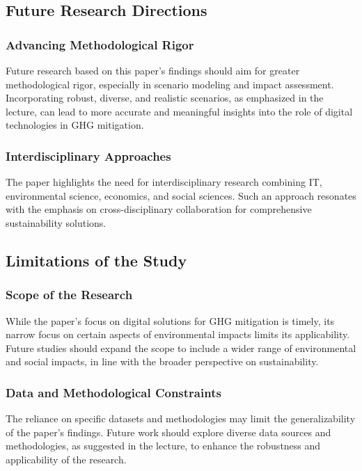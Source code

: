 \documentclass[conference,compsoc]{IEEEtran}
\begin{document}
\subsection{Future Research Directions}

\subsubsection{Advancing Methodological Rigor}

Future research based on this paper's findings should aim for greater methodological rigor, especially in scenario modeling and impact assessment. Incorporating robust, diverse, and realistic scenarios, as emphasized in the lecture, can lead to more accurate and meaningful insights into the role of digital technologies in GHG mitigation.

\subsubsection{Interdisciplinary Approaches}

The paper highlights the need for interdisciplinary research combining IT, environmental science, economics, and social sciences. Such an approach resonates with the  emphasis on cross-disciplinary collaboration for comprehensive sustainability solutions.

\subsection{Limitations of the Study}

\subsubsection{Scope of the Research}

While the paper's focus on digital solutions for GHG mitigation is timely, its narrow focus on certain aspects of environmental impacts limits its applicability. Future studies should expand the scope to include a wider range of environmental and social impacts, in line with the  broader perspective on sustainability.

\subsubsection{Data and Methodological Constraints}

The reliance on specific datasets and methodologies may limit the generalizability of the paper's findings. Future work should explore diverse data sources and methodologies, as suggested in the lecture, to enhance the robustness and applicability of the research.
\end{document}
